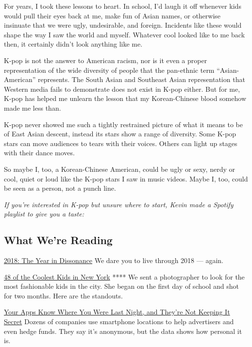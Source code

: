 For years, I took these lessons to heart. In school, I'd laugh it off
whenever kids would pull their eyes back at me, make fun of Asian names,
or otherwise insinuate that we were ugly, undesirable, and foreign.
Incidents like these would shape the way I saw the world and myself.
Whatever cool looked like to me back then, it certainly didn't look
anything like me.

K-pop is not the answer to American racism, nor is it even a proper
representation of the wide diversity of people that the pan-ethnic term
``Asian-American'' represents. The South Asian and Southeast Asian
representation that Western media fails to demonstrate does not exist in
K-pop either. But for me, K-pop has helped me unlearn the lesson that my
Korean-Chinese blood somehow made me less than.

K-pop never showed me such a tightly restrained picture of what it means
to be of East Asian descent, instead its stars show a range of
diversity. Some K-pop stars can move audiences to tears with their
voices. Others can light up stages with their dance moves.

So maybe I, too, a Korean-Chinese American, could be ugly or sexy, nerdy
or cool, quiet or loud like the K-pop stars I saw in music videos. Maybe
I, too, could be seen as a person, not a punch line.

\emph{If you're interested in K-pop but unsure where to start, Kevin
made a Spotify playlist to give you a taste:}

\hypertarget{what-were-reading}{%
\subsection{What We're Reading}\label{what-were-reading}}

\href{https://www.nytimes.com/interactive/2018/12/11/style/2018-year-in-review.html}{2018:
The Year in Dissonance} We dare you to live through 2018 --- again.

\href{https://www.nytimes.com/2018/11/27/magazine/48-of-the-coolest-kids-in-new-york.html}{48
of the Coolest Kids in New York} **** We sent a photographer to look for
the most fashionable kids in the city. She began on the first day of
school and shot for two months. Here are the standouts.

\href{https://www.nytimes.com/interactive/2018/12/10/business/location-data-privacy-apps.html}{Your
Apps Know Where You Were Last Night, and They're Not Keeping It Secret}
Dozens of companies use smartphone locations to help advertisers and
even hedge funds. They say it's anonymous, but the data shows how
personal it is.

